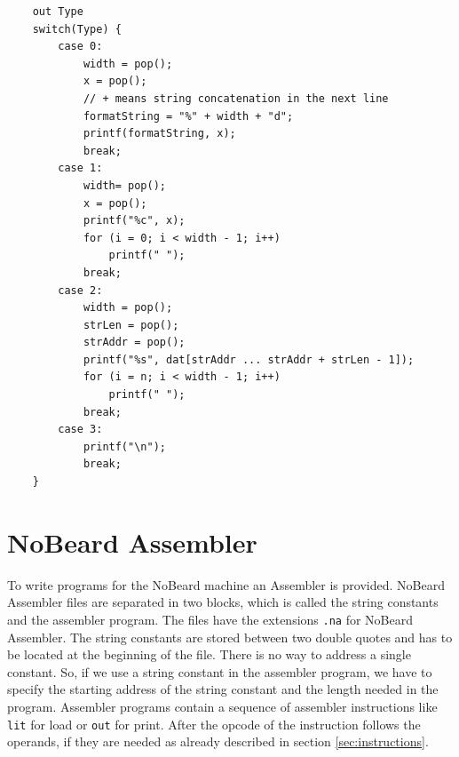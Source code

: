 	\begin{lstlisting}
	out Type
	switch(Type) {
		case 0:
			width = pop();
			x = pop();
			// + means string concatenation in the next line
			formatString = "%" + width + "d";
			printf(formatString, x);
			break;
		case 1:
			width= pop();
			x = pop();
			printf("%c", x);
			for (i = 0; i < width - 1; i++)
				printf(" ");
			break;
		case 2:
			width = pop();
			strLen = pop();
			strAddr = pop();
			printf("%s", dat[strAddr ... strAddr + strLen - 1]);
			for (i = n; i < width - 1; i++)
				printf(" ");
			break;
		case 3:
			printf("\n");
			break;
	}
	\end{lstlisting}
	
\section{NoBeard Assembler}
To write programs for the NoBeard machine an Assembler is provided. NoBeard Assembler files are separated in two blocks, which is called the string constants and the assembler program. The files have the extensions \lstinline$.na$ for NoBeard Assembler. The string constants are stored between two double quotes and has to be located at the beginning of the file. There is no way to address a single constant. So, if we use a string constant in the assembler program, we have to specify the starting address of the string constant and the length needed in the program. Assembler programs  contain a sequence of assembler instructions like \lstinline$lit$ for load or \lstinline$out$ for print. After the opcode of the instruction follows the operands, if they are needed as already described in section \ref{sec:instructions}.